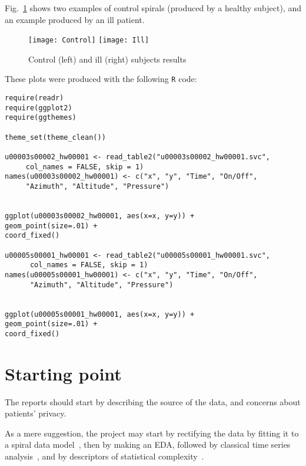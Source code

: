 \documentclass[11pt]{article}
\begin{document}
Fig.~\ref{Fig:ExampleSpirals} shows two examples of control spirals (produced by a healthy subject), and an example produced by an ill patient.

\begin{figure}
\centering
\texttt{[image: Control]}
\texttt{[image: Ill]}
\caption{Control (left) and ill (right) subjects results}\label{Fig:ExampleSpirals}
\end{figure}

These plots were produced with the following \texttt{R} code:

\begin{verbatim}
require(readr)
require(ggplot2)
require(ggthemes)

theme_set(theme_clean())

u00003s00002_hw00001 <- read_table2("u00003s00002_hw00001.svc", 
     col_names = FALSE, skip = 1)
names(u00003s00002_hw00001) <- c("x", "y", "Time", "On/Off", 
     "Azimuth", "Altitude", "Pressure")


ggplot(u00003s00002_hw00001, aes(x=x, y=y)) +
geom_point(size=.01) +
coord_fixed()

u00005s00001_hw00001 <- read_table2("u00005s00001_hw00001.svc", 
      col_names = FALSE, skip = 1)
names(u00005s00001_hw00001) <- c("x", "y", "Time", "On/Off", 
      "Azimuth", "Altitude", "Pressure")


ggplot(u00005s00001_hw00001, aes(x=x, y=y)) +
geom_point(size=.01) +
coord_fixed()
\end{verbatim}


\section{Starting point}

The reports should start by describing the source of the data, and concerns about patients' privacy.

As a mere suggestion, 
the project may start by rectifying the data by fitting it to a spiral data model~\citep[see, for instance,][]{AnAlgorithmforFittingArchimedeanSpiraltoEmpiricalData}, 
then by making an EDA, 
followed by classical time series analysis~\citep{IntroductoryTimeSerieswithR}, 
and by descriptors of statistical complexity~\citep{RepresentationSpaceTimeSeries}.




\end{document}
